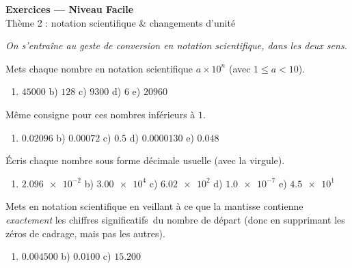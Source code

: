 \documentclass[11pt,a4paper]{article}
\newcommand{\CS}{chiffres significatifs}
\begin{document}
\begin{center}
{\Large\bfseries\color{primarydark} Exercices — Niveau Facile}\\[1pt]
{\color{primary} Thème 2 : notation scientifique \& changements d'unité}
\end{center}
\vspace{1mm}
\textit{On s'entraîne au geste de conversion en notation scientifique, dans les deux sens.}
\vspace{2mm}

\begin{exo}
Mets chaque nombre en notation scientifique $a\times 10^{n}$ (avec $1\le a <10$).
\begin{enumerate}[label=\alph*),leftmargin=1.6em,itemsep=1pt]
  \item $\num{45000}$ \qquad b) $\num{128}$ \qquad c) $\num{9300}$ \qquad d) $\num{6}$ \qquad e) $\num{20960}$
\end{enumerate}
\end{exo}

\begin{exo}
Même consigne pour ces nombres inférieurs à $1$.
\begin{enumerate}[label=\alph*),leftmargin=1.6em,itemsep=1pt]
  \item $\num{0,02096}$ \qquad b) $\num{0,00072}$ \qquad c) $\num{0,5}$ \qquad d) $\num{0,0000130}$ \qquad e) $\num{0,048}$
\end{enumerate}
\end{exo}

\begin{exo}
Écris chaque nombre sous forme décimale usuelle (avec la virgule).
\begin{enumerate}[label=\alph*),leftmargin=1.6em,itemsep=1pt]
  \item $\num{2,096e-2}$ \qquad b) $\num{3,00e4}$ \qquad c) $\num{6,02e2}$ \qquad d) $\num{1,0e-7}$ \qquad e) $\num{4,5e1}$
\end{enumerate}
\end{exo}

\begin{exo}
Mets en notation scientifique en veillant à ce que la mantisse contienne \emph{exactement} les \CS\
du nombre de départ (donc en supprimant les zéros de cadrage, mais pas les autres).
\begin{enumerate}[label=\alph*),leftmargin=1.6em,itemsep=1pt]
  \item $\num{0,004500}$ \qquad b) $\num{0,0100}$ \qquad c) $\num{15,200}$
\end{enumerate}
\end{exo}
\end{document}
